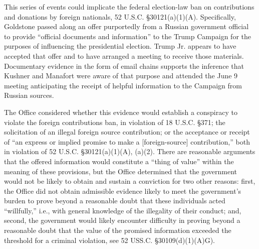 This series of events could implicate the federal election-law ban on contributions and donations by foreign nationals, 52 U.S.C. \S 30121(a)(1)(A).
Specifically, Goldstone passed along an offer purportedly from a Russian government official to provide ``official documents and information'' to the Trump Campaign for the purposes of influencing the presidential election.
Trump Jr. appears to have accepted that offer and to have arranged a meeting to receive those materials.
Documentary evidence in the form of email chains supports the inference that Kushner and Manafort were aware of that purpose and attended the June 9 meeting anticipating the receipt of helpful information to the Campaign from Russian sources.

The Office considered whether this evidence would establish a conspiracy to violate the foreign contributions ban, in violation of 18 U.S.C. \S 371; the solicitation of an illegal foreign source contribution; or the acceptance or receipt of ``an express or implied promise to make a [foreign-source] contribution,'' both in violation of 52 U.S.C. \S 30121(a)(1)(A), (a)(2).
There are reasonable arguments that the offered information would constitute a ``thing of value'' within the meaning of these provisions, but the Office determined that the government would not be likely to obtain and sustain a conviction for two other reasons: first, the Office did not obtain admissible evidence likely to meet the government's burden to prove beyond a reasonable doubt that these individuals acted ``willfully,'' i.e., with general knowledge of the illegality of their conduct; and, second, the government would likely encounter difficulty in proving beyond a reasonable doubt that the value of the promised information exceeded the threshold for a criminal violation, see 52 USS.C. \S 30109(d)(1)(A)G).

